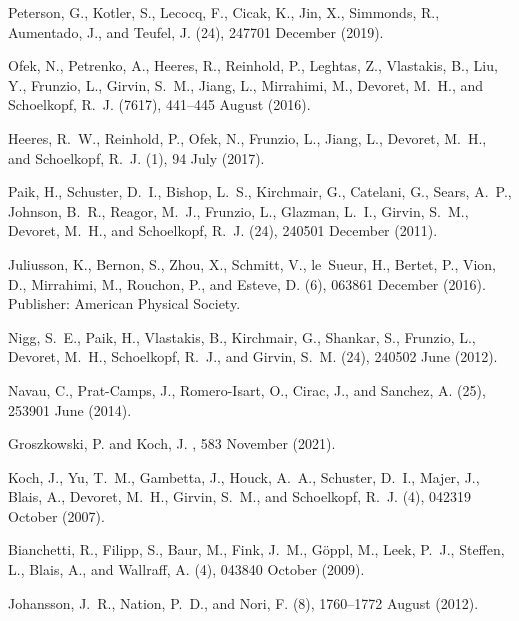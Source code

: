 \documentclass[a4paper, amsfonts, amssymb, amsmath, reprint,showkeys,nofootinbib,superscriptaddress]{revtex4-2}
\begin{document}
\begin{thebibliography}{10}
	Peterson, G., Kotler, S., Lecocq, F., Cicak, K., Jin, X., Simmonds, R.,
	Aumentado, J., and Teufel, J.
	(24), 247701 December  (2019).
	
	Ofek, N., Petrenko, A., Heeres, R., Reinhold, P., Leghtas, Z., Vlastakis, B.,
	Liu, Y., Frunzio, L., Girvin, S.~M., Jiang, L., Mirrahimi, M., Devoret,
	M.~H., and Schoelkopf, R.~J.
	(7617), 441--445 August  (2016).
	
	Heeres, R.~W., Reinhold, P., Ofek, N., Frunzio, L., Jiang, L., Devoret, M.~H.,
	and Schoelkopf, R.~J.
	(1), 94 July  (2017).
	
	Paik, H., Schuster, D.~I., Bishop, L.~S., Kirchmair, G., Catelani, G., Sears,
	A.~P., Johnson, B.~R., Reagor, M.~J., Frunzio, L., Glazman, L.~I., Girvin,
	S.~M., Devoret, M.~H., and Schoelkopf, R.~J.
	(24), 240501 December  (2011).
	
	Juliusson, K., Bernon, S., Zhou, X., Schmitt, V., le~Sueur, H., Bertet, P.,
	Vion, D., Mirrahimi, M., Rouchon, P., and Esteve, D.
	(6), 063861 December  (2016).
	\newblock Publisher: American Physical Society.
	
	Nigg, S.~E., Paik, H., Vlastakis, B., Kirchmair, G., Shankar, S., Frunzio, L.,
	Devoret, M.~H., Schoelkopf, R.~J., and Girvin, S.~M.
	(24), 240502 June  (2012).
	
	Navau, C., Prat-Camps, J., Romero-Isart, O., Cirac, J., and Sanchez, A.
	(25), 253901 June  (2014).
	
	Groszkowski, P. and Koch, J.
	, 583 November  (2021).
	
	Koch, J., Yu, T.~M., Gambetta, J., Houck, A.~A., Schuster, D.~I., Majer, J.,
	Blais, A., Devoret, M.~H., Girvin, S.~M., and Schoelkopf, R.~J.
	(4), 042319 October  (2007).
	
	Bianchetti, R., Filipp, S., Baur, M., Fink, J.~M., Göppl, M., Leek, P.~J.,
	Steffen, L., Blais, A., and Wallraff, A.
	(4), 043840 October  (2009).
	
	Johansson, J.~R., Nation, P.~D., and Nori, F.
	(8), 1760--1772 August
	(2012).
	
\end{thebibliography}
\end{document}
